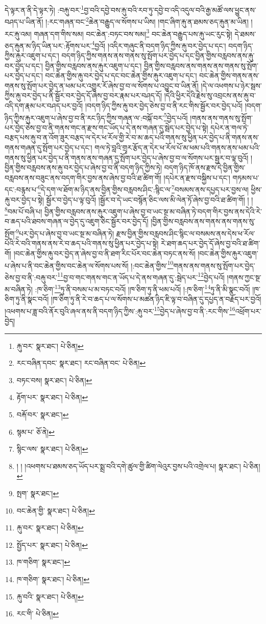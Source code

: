 དེ་ལྟར་ན་ནི་དེ་ལྟར་ཏེ། :བརྐུ་བར་\footnote{རྐུ་བར་  སྣར་ཐང་།  པེ་ཅིན། }བྱ་བའི་དབྱེ་བས་རྐུ་བའི་རབ་ཏུ་དབྱེ་བ་འདི་འདུལ་བའི་རྒྱ་མཚོ་ལས་ཕྱུང་ནས་བཤད་པ་ཡིན་ནོ། །:རང་གཞན་བང་\footnote{རང་བཞིན་དབང་  སྣར་ཐང་། རང་བཞིན་བང་  པེ་ཅིན། }ཆེན་བརྒྱུད་ལ་སོགས་པ་ཡིས། །གང་ཞིག་རྐུ་ན་ཐམས་ཅད་རྐུན་མ་ཡིན། །རང་རྐུ་འམ། གཞན་དག་གིས་སམ། བང་ཆེན་:བཏང་བས་སམ།\footnote{བཏང་བས།  སྣར་ཐང་།  པེ་ཅིན། } བང་ཆེན་བརྒྱུད་པས་རྐུ་ཡང་རུང་སྟེ། དེ་ཐམས་ཅད་རྐུན་མ་ཉིད་ཡིན་པར་:རྟོགས་པར་\footnote{རྟོག་པར་  སྣར་ཐང་།  པེ་ཅིན། }བྱའོ། །འདིར་གཞུང་ནི་བདག་ཉིད་ཀྱིས་རྐུ་བར་བྱེད་པ་དང་། བདག་ཉིད་ཀྱིས་རྐུར་འཇུག་པ་དང་། བདག་ཉིད་ཀྱིས་གནས་ནས་གནས་སུ་སྤོག་པར་བྱེད་པ་དང་བྱིན་གྱིས་བརླབས་ནས་རྐུ་བར་བྱེད་པ་དང་། བྱིན་གྱིས་བརླབས་ནས་རྐུར་འཇུག་པ་དང་། བྱིན་གྱིས་བརླབས་ནས་གནས་ནས་གནས་སུ་སྤོག་པར་བྱེད་པ་དང་། བང་ཆེན་གྱིས་རྐུ་བར་བྱེད་པ་དང་བང་ཆེན་གྱིས་རྐུར་འཇུག་པ་དང་། བང་ཆེན་གྱིས་གནས་ནས་གནས་སུ་སྤོག་པར་བྱེད་ན་ཕམ་པར་འགྱུར་རོ་ཞེས་བྱ་བ་ལ་སོགས་པ་འབྱུང་བ་ཡིན་ནོ། །དེ་ལ་འཕགས་པ་ཉེར་སྦས་ཀྱིས་རྐུ་བར་བྱེད་པ་ནི་སྦྱོར་བར་བྱེད་དོ་ཞེས་བྱ་བར་རྣམ་པར་བཤད་དོ། །དེའི་ཕྱིར་དེའི་རྗེས་སུ་འབྲངས་ནས་རྐུ་བ་འདི་དག་རྣམ་པར་བཤད་པར་བྱའོ། །བདག་ཉིད་ཀྱིས་རྐུ་བར་བྱེད་ཅེས་བྱ་བ་ནི་རང་གིས་སྦྱོར་བར་བྱེད་པའོ། །བདག་ཉིད་ཀྱིས་རྐུར་འཇུག་པ་ཞེས་བྱ་བ་ནི་རང་ཉིད་ཀྱིས་གཞན་ལ་:བསྐོ་བར་\footnote{བརྐོ་བར་  སྣར་ཐང་། }བྱེད་པའོ། །གནས་ནས་གནས་སུ་སྤོག་པར་བྱེད་ཅེས་བྱ་བ་ནི་གནས་གང་ན་རྫས་གང་ཡོད་པ་དེ་ནས་གཞན་དུ་སྦེད་པར་བྱེད་པ་སྟེ། དཔེར་ན་གལ་ཏེ་བརྩད་པས་རྐུ་བ་ན་འོག་ཟུར་བརྩད་ལ་དེར་ཕ་རོལ་གྱི་རེ་བ་མ་ཆད་པའི་གནས་སུ་ཕྱིན་པར་བྱེད་པ་ནི་གནས་ནས་གནས་གཞན་དུ་སྤོག་པར་བྱེད་པ་དང་། གལ་ཏེ་བླའི་གྲྭར་རྩོད་ན་དེར་ཕ་རོལ་པོ་མ་ཕམ་པའི་གནས་ནས་ཕམ་པའི་གནས་སུ་ཕྱིན་པར་བྱེད་པ་ནི་གནས་ནས་གཞན་དུ་སྤོག་པར་བྱེད་པ་ཞེས་བྱ་བ་ལ་སོགས་པར་སྦྱར་བ་ལྟ་བུའོ། །བྱིན་གྱིས་བརླབས་ནས་རྐུ་བར་བྱེད་པ་ཞེས་བྱ་བ་ནི་བདག་ཉིད་ཀྱིས་ཏེ། བདག་ཉིད་ཁོ་ནས་རྫས་དེ་བྱིན་གྱིས་བརླབས་ནས་བཟུང་ནས་བདག་གིར་བྱས་ནས་ཞེས་བྱ་བའི་ཐ་ཚིག་གོ། །དཔེར་ན་རྫས་བསྐྱིས་པ་དང་། གཏམས་པ་དང་:བརྙས་པ་\footnote{སྙམ་པ་  ཅོ་ནེ། }དེ་དག་ལ་ཐོག་མ་ཉིད་ནས་བྱིན་གྱིས་བརླབས་ཤིང་:སྙིང་ལ་\footnote{སྙིང་ལས་  སྣར་ཐང་།  པེ་ཅིན། }བསམས་ནས་དཔྱད་པར་བྱས་ལ། ཕྱིས་རྐུ་བར་བྱེད་པ་སྟེ། སྦྱོར་བ་བྱེད་པ་ལྟ་བུའོ། །སྦྱོར་བ་དེ་ཡང་བསྙོན་ཅིང་ལས་མི་ལེན་ཏོ་ཞེས་བྱ་བའི་ཐ་ཚིག་གོ། ། །\footnote{། ། །འཕགས་པ་ཐམས་ཅད་ཡོད་པར་སྨྲ་བའི་དགེ་ཚུལ་གྱི་ཚིག་ལེའུར་བྱས་པའི་འགྲེལ་པ།   སྣར་ཐང་།  པེ་ཅིན། }བམ་པོ་བཞི་པ། བྱིན་གྱིས་བརླབས་ནས་རྐུར་འཇུག་པ་ཞེས་བྱ་བ་ཡང་སྔ་མ་བཞིན་ཏེ་བདག་གིར་བྱས་ནས་དེའི་རེ་བ་ཆད་པའི་ཐབས་གཞན་ལ་བྱེད་དུ་འཇུག་ཅིང་སྦྱོར་བར་བྱེད་དོ། །བྱིན་གྱིས་བརླབས་ནས་གནས་ནས་གནས་སུ་སྤོག་\footnote{སྤག་  སྣར་ཐང་། }པར་བྱེད་པ་ཞེས་བྱ་བ་ཡང་སྔ་མ་བཞིན་ཏེ། རྫས་བྱིན་གྱིས་བརླབས་ཤིང་སྙིང་ལ་བསམས་ནས་དེས་ཕ་རོལ་པོའི་རེ་བའི་གནས་ནས་རེ་བ་ཆད་པའི་གནས་སུ་ཕྱིན་པར་བྱེད་པ་སྟེ། རེ་ཐག་ཆད་པར་བྱེད་དོ་ཞེས་བྱ་བའི་ཐ་ཚིག་གོ། །བང་ཆེན་གྱིས་རྐུ་བར་བྱེད་ན་ཞེས་བྱ་བ་ནི་ཐག་རིང་པོར་བང་ཆེན་བཏང་ནས་སོ། །བང་ཆེན་གྱིས་རྐུར་འཇུག་པ་ཞེས་པ་ནི་བང་ཆེན་གྱིས་བང་ཆེན་ལ་སོགས་པས་སོ། །:བང་ཆེན་གྱིས་\footnote{བང་ཆེན་གྱི་  སྣར་ཐང་།  པེ་ཅིན། }གནས་ནས་གནས་སུ་སྤོག་པར་བྱེད་ཅེས་བྱ་བ་ནི་:བརྐུ་བར་\footnote{རྐུ་བར་  སྣར་ཐང་།  པེ་ཅིན། }བྱ་བ་གང་གནས་གང་ན་ཡོད་པ་དེ་ནས་གཞན་དུ་:སྦེད་པར་\footnote{སྤྱོད་པར་  སྣར་ཐང་།  པེ་ཅིན། }བྱེད་པའོ། །གནས་ཀྱང་སྔ་མ་བཞིན་ཏེ། :ཁ་ཅིག་\footnote{ཁ་གཅིག་  སྣར་ཐང་། }ཏུ་ནི་བསམ་པ་མ་བཏང་བའོ། །ཁ་ཅིག་ཏུ་ནི་ཕམ་པའོ། །:ཁ་ཅིག་\footnote{ཁ་གཅིག་  སྣར་ཐང་།  པེ་ཅིན། }ཏུ་ནི་མི་སྣང་བའོ། །ཁ་ཅིག་ཏུ་ནི་སྣང་བའོ། །ཁ་ཅིག་ཏུ་ནི་རེ་བ་ཆད་པ་ལ་སོགས་པ་མཚན་ཉིད་ཇི་ལྟ་བ་བཞིན་དུ་དཔྱད་ན་བརྗོད་པར་བྱའོ། །འཕགས་པ་ཟླ་བའི་ནོར་བུའི་ཞལ་ནས་ནི་བདག་ཉིད་ཀྱིས་:རྐུ་བར་\footnote{རྐུ་བའི་  སྣར་ཐང་།  པེ་ཅིན། }བྱེད་པ་ཞེས་བྱ་བ་ནི་:རང་གིས་\footnote{རང་གི་  པེ་ཅིན། }འཕྲོག་པར་བྱེད། 